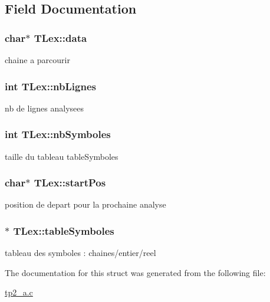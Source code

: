 \subsection{Field Documentation}
\subsubsection[{\texorpdfstring{data}{data}}]{\setlength{\rightskip}{0pt plus 5cm}char$\ast$ T\+Lex\+::data}\hypertarget{structTLex_a2242e630c3f871659c3e36b101b504b4}{}\label{structTLex_a2242e630c3f871659c3e36b101b504b4}
chaine a parcourir 
\subsubsection[{\texorpdfstring{nb\+Lignes}{nbLignes}}]{\setlength{\rightskip}{0pt plus 5cm}int T\+Lex\+::nb\+Lignes}\hypertarget{structTLex_a74499b75b25dc1bce1fb2f66af6ce1e2}{}\label{structTLex_a74499b75b25dc1bce1fb2f66af6ce1e2}
nb de lignes analysees 
\subsubsection[{\texorpdfstring{nb\+Symboles}{nbSymboles}}]{\setlength{\rightskip}{0pt plus 5cm}int T\+Lex\+::nb\+Symboles}\hypertarget{structTLex_a84d0d3a30f4b42f8db675f8cbb60373f}{}\label{structTLex_a84d0d3a30f4b42f8db675f8cbb60373f}
taille du tableau table\+Symboles 
\subsubsection[{\texorpdfstring{start\+Pos}{startPos}}]{\setlength{\rightskip}{0pt plus 5cm}char$\ast$ T\+Lex\+::start\+Pos}\hypertarget{structTLex_a1122e1ced17c2c07f7975b4f11110ad8}{}\label{structTLex_a1122e1ced17c2c07f7975b4f11110ad8}
position de depart pour la prochaine analyse 
\subsubsection[{\texorpdfstring{table\+Symboles}{tableSymboles}}]{$\ast$ T\+Lex\+::table\+Symboles}\hypertarget{structTLex_a31a6c4fc0839643e3251a372ba7adf04}{}\label{structTLex_a31a6c4fc0839643e3251a372ba7adf04}
tableau des symboles \+: chaines/entier/reel 

The documentation for this struct was generated from the following file\+:\begin{DoxyCompactItemize}
\item 
\hyperlink{tp2__a_8c}{tp2\+\_\+a.\+c}\end{DoxyCompactItemize}
